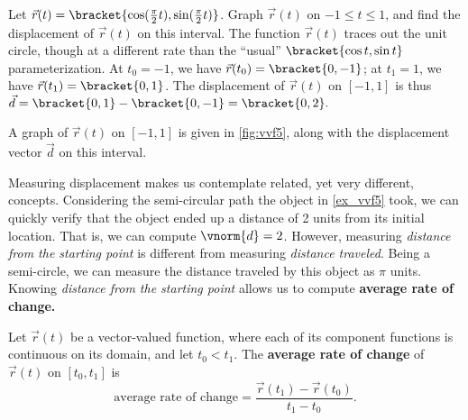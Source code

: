 \begin{example}\label{ex_vvf5}
Let $\vec r(t) =\bracket{\cos (\frac{\pi}{2}t),\sin (\frac{\pi}2 t)}$. Graph $\vec r(t)$ on $-1\leq t\leq 1$, and find the displacement of $\vec r(t)$ on this interval.
\solution
The function $\vec r(t)$ traces out the unit circle, though at a different rate than the ``usual'' $\bracket{\cos t,\sin t}$ parameterization. At $t_0=-1$, we have $\vec r(t_0) =\bracket{0,-1}$; at $t_1=1$, we have $\vec r(t_1) =\bracket{0,1}$. The displacement of $\vec r(t)$ on $[-1,1]$ is thus $\vec d =\bracket{0,1}-\bracket{0,-1}=\bracket{0,2}.$


A graph of $\vec r(t)$ on $[-1,1]$ is given in \autoref{fig:vvf5}, along with the displacement vector $\vec d$ on this interval.
\end{example}

Measuring displacement makes us contemplate related, yet very different, concepts. Considering the semi-circular path the object in \autoref{ex_vvf5} took, we can quickly verify that the object ended up a distance of 2 units from its initial location. That is, we can compute $\vnorm{d} = 2$. However, measuring \emph{distance from the starting point} is different from measuring \emph{distance traveled}. Being a semi-circle, we can measure the distance traveled by this object as $\pi%
$ units. Knowing \emph{distance from the starting point} allows us to compute \textbf{average rate of change.}

\begin{definition}\label{def:av_rate_of_change_vect}
Let $\vec r(t)$ be a vector-valued function, where each of its component functions is continuous on its domain, and let $t_0<t_1$. The \textbf{average rate of change} of $\vec r(t)$ on $[t_0,t_1]$ is
\[\text{average rate of change} = \frac{\vec r(t_1) - \vec r(t_0)}{t_1-t_0}.\]
\end{definition}

